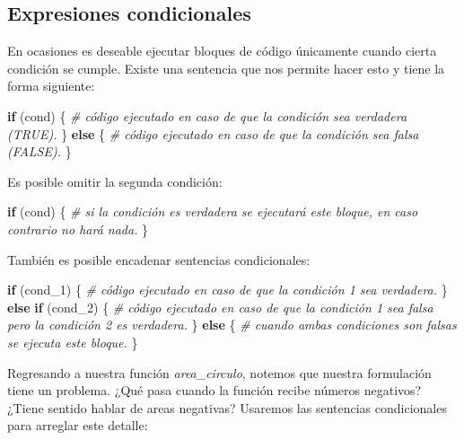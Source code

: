 \documentclass[]{book}
\newenvironment{Shaded}{\begin{snugshade}}{\end{snugshade}}
\newcommand{\DecValTok}[1]{\textcolor[rgb]{0.00,0.00,0.81}{#1}}
\newcommand{\CommentTok}[1]{\textcolor[rgb]{0.56,0.35,0.01}{\textit{#1}}}
\newcommand{\ControlFlowTok}[1]{\textcolor[rgb]{0.13,0.29,0.53}{\textbf{#1}}}
\newcommand{\NormalTok}[1]{#1}
\theoremstyle{definition}
\theoremstyle{definition}
\theoremstyle{definition}
\theoremstyle{remark}
\begin{document}
\subsection{Expresiones condicionales}\label{expresiones-condicionales}

En ocasiones es deseable ejecutar bloques de código únicamente cuando
cierta condición se cumple. Existe una sentencia que nos permite hacer
esto y tiene la forma siguiente:

\begin{Shaded}
\begin{Highlighting}[]
\ControlFlowTok{if}\NormalTok{ (cond) \{}
  \CommentTok{# código ejecutado en caso de que la condición sea verdadera (TRUE).}
\NormalTok{\} }\ControlFlowTok{else}\NormalTok{ \{}
  \CommentTok{# código ejecutado en caso de que la condición sea falsa (FALSE).}
\NormalTok{\}}
\end{Highlighting}
\end{Shaded}

Es posible omitir la segunda condición:

\begin{Shaded}
\begin{Highlighting}[]
\ControlFlowTok{if}\NormalTok{ (cond) \{}
  \CommentTok{# si la condición es verdadera se ejecutará este bloque, en caso contrario no hará nada.}
\NormalTok{\}}
\end{Highlighting}
\end{Shaded}

También es posible encadenar sentencias condicionales:

\begin{Shaded}
\begin{Highlighting}[]
\ControlFlowTok{if}\NormalTok{ (cond_}\DecValTok{1}\NormalTok{) \{}
  \CommentTok{# código ejecutado en caso de que la condición 1 sea verdadera.}
\NormalTok{\} }\ControlFlowTok{else} \ControlFlowTok{if}\NormalTok{ (cond_}\DecValTok{2}\NormalTok{) \{}
  \CommentTok{# código ejecutado en caso de que la condición 1 sea falsa pero la condición 2 es verdadera.}
\NormalTok{\} }\ControlFlowTok{else}\NormalTok{ \{}
  \CommentTok{# cuando ambas condiciones son falsas se ejecuta este bloque.}
\NormalTok{\}}
\end{Highlighting}
\end{Shaded}

Regresando a nuestra función \emph{area\_circulo}, notemos que nuestra
formulación tiene un problema. ¿Qué pasa cuando la función recibe
números negativos? ¿Tiene sentido hablar de areas negativas? Usaremos
las sentencias condicionales para arreglar este detalle:
\end{document}
